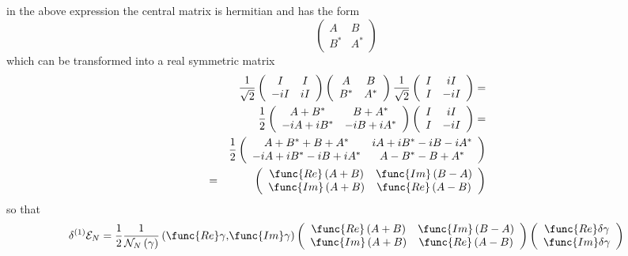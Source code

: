 \documentclass[aps,preprint]{revtex4}
\begin{document}
in the above expression the central matrix is hermitian and has the form%
\begin{equation}
\left( 
\begin{array}{cc}
A & B \\ 
B^{\ast } & A^{\ast }%
\end{array}%
\right)
\end{equation}%
which can be transformed into a real symmetric matrix 
\begin{eqnarray}
&&\frac{1}{\sqrt{2}}\left( 
\begin{array}{cc}
I & I \\ 
-iI & iI%
\end{array}%
\right) \left( 
\begin{array}{cc}
A & B \\ 
B^{\ast } & A^{\ast }%
\end{array}%
\right) \frac{1}{\sqrt{2}}\left( 
\begin{array}{cc}
I & iI \\ 
I & -iI%
\end{array}%
\right) =  \nonumber \\
&&\frac{1}{2}\left( 
\begin{array}{cc}
A+B^{\ast } & B+A^{\ast } \\ 
-iA+iB^{\ast } & -iB+iA^{\ast }%
\end{array}%
\right) \left( 
\begin{array}{cc}
I & iI \\ 
I & -iI%
\end{array}%
\right) =  \nonumber \\
&&\frac{1}{2}\left( 
\begin{array}{cc}
A+B^{\ast }+B+A^{\ast } & iA+iB^{\ast }-iB-iA^{\ast } \\ 
-iA+iB^{\ast }-iB+iA^{\ast } & A-B^{\ast }-B+A^{\ast }%
\end{array}%
\right)  \nonumber \\
&=&\left( 
\begin{array}{cc}
\func{Re}\left( A+B\right) & \func{Im}\left( B-A\right) \\ 
\func{Im}\left( A+B\right) & \func{Re}\left( A-B\right)%
\end{array}%
\right)
\end{eqnarray}%
so that 
\begin{equation}
\delta ^{\left( 1\right) }\mathcal{E}_{N}=\frac{1}{2}\frac{1}{\mathcal{N}%
_{N}\left( \mathbf{\gamma }\right) }\left( \func{Re}\mathbf{\gamma ,}\func{Im%
}\mathbf{\gamma }\right) \left( 
\begin{array}{cc}
\func{Re}\left( A+B\right) & \func{Im}\left( B-A\right) \\ 
\func{Im}\left( A+B\right) & \func{Re}\left( A-B\right)%
\end{array}%
\right) \left( 
\begin{array}{c}
\func{Re}\delta \mathbf{\gamma } \\ 
\func{Im}\delta \mathbf{\gamma }%
\end{array}%
\right)
\end{equation}
\end{document}
